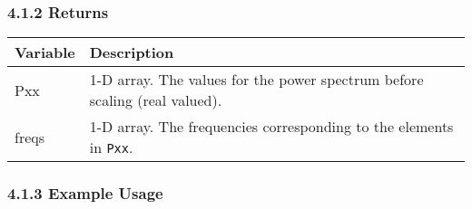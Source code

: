 \documentclass[]{article}
\begin{document}
\subsubsection{4.1.2 Returns}\label{returns}

\begin{longtable}[]{@{}ll@{}}
\toprule
\begin{minipage}[b]{0.15\columnwidth}\raggedright\strut
Variable\strut
\end{minipage} & \begin{minipage}[b]{0.80\columnwidth}\raggedright\strut
Description\strut
\end{minipage}\tabularnewline
\midrule
\endhead
\begin{minipage}[t]{0.15\columnwidth}\raggedright\strut
Pxx\strut
\end{minipage} & \begin{minipage}[t]{0.80\columnwidth}\raggedright\strut
1-D array. The values for the power spectrum before scaling (real
valued).\strut
\end{minipage}\tabularnewline
\begin{minipage}[t]{0.15\columnwidth}\raggedright\strut
freqs\strut
\end{minipage} & \begin{minipage}[t]{0.80\columnwidth}\raggedright\strut
1-D array. The frequencies corresponding to the elements in
\texttt{Pxx}.\strut
\end{minipage}\tabularnewline
\bottomrule
\end{longtable}

\subsubsection{4.1.3 Example Usage}\label{example-usage-3}
\end{document}
